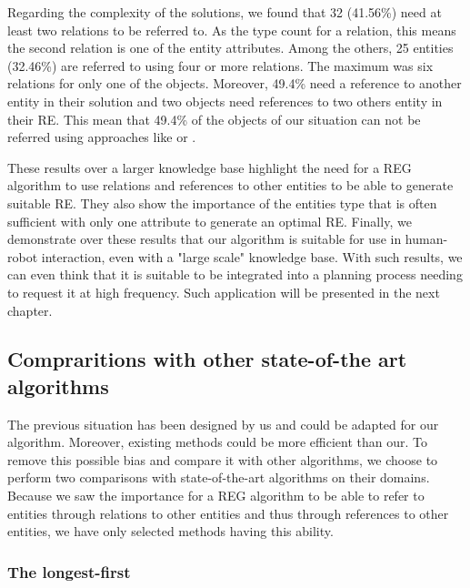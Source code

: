 Regarding the complexity of the solutions, we found that 32 (41.56\%) need at least two relations to be referred to. As the type count for a relation, this means the second relation is one of the entity attributes. Among the others, 25 entities (32.46\%) are referred to using four or more relations. The maximum was six relations for only one of the objects. Moreover, 49.4\% need a reference to another entity in their solution and two objects need references to two others entity in their RE. This mean that 49.4\% of the objects of our situation can not be referred using approaches like \cite{ros_2010_which} or \cite{dale_1995_computational}.

These results over a larger knowledge base highlight the need for a REG algorithm to use relations and references to other entities to be able to generate suitable RE. They also show the importance of the entities type that is often sufficient with only one attribute to generate an optimal RE. Finally, we demonstrate over these results that our algorithm is suitable for use in human-robot interaction, even with a "large scale" knowledge base. With such results, we can even think that it is suitable to be integrated into a planning process needing to request it at high frequency. Such application will be presented in the next chapter.


\subsection{Compraritions with other state-of-the art algorithms}

The previous situation has been designed by us and could be adapted for our algorithm. Moreover, existing methods could be more efficient than our. To remove this possible bias and compare it with other algorithms, we choose to perform two comparisons with state-of-the-art algorithms on their domains. Because we saw the importance for a REG algorithm to be able to refer to entities through relations to other entities and thus through references to other entities, we have only selected methods having this ability.

\subsubsection{The longest-first}

